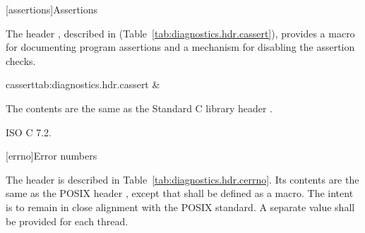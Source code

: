 [assertions]{Assertions}

\pnum
The header
, described in
(Table~\ref{tab:diagnostics.hdr.cassert}),
provides a macro for documenting \Cpp program assertions and a mechanism
for disabling the assertion checks.

\begin{libsyntab2}{cassert}{tab:diagnostics.hdr.cassert}
\macro  &     \\
\end{libsyntab2}

\pnum
The contents are the same as the Standard C library header
.

\xref
ISO C 7.2.

[errno]{Error numbers}

\pnum
The header  is described in Table~\ref{tab:diagnostics.hdr.cerrno}. Its contents are the same as the POSIX header , except that  shall be defined as a macro. \enternote The intent is to remain in close alignment with the POSIX standard. \exitnote A separate  value shall be provided for each thread.

